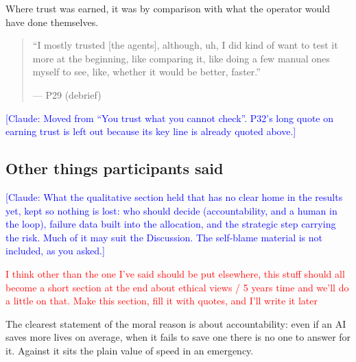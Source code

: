 \label{sec:qual:trust-unchecked:earned}
Where trust was earned, it was by comparison with what the operator would have done themselves.

\begin{quote}\small
``I mostly trusted [the agents], although, uh, I did kind of want to test it more at the beginning, like comparing it, like doing a few manual ones myself to see, like, whether it would be better, faster.''\par\hfill--- P29 (debrief)
\end{quote}
\textcolor{blue}{[Claude: Moved from ``You trust what you cannot check''. P32's long quote on earning trust is left out because its key line is already quoted above.]}

\clearpage

\subsection{Other things participants said}\label{sec:qual}\label{sec:qual:who-decides}\label{sec:qual:failure}
\textcolor{blue}{[Claude: What the qualitative section held that has no clear home in the results yet, kept so nothing is lost: who should decide (accountability, and a human in the loop), failure data built into the allocation, and the strategic step carrying the risk. Much of it may suit the Discussion. The self-blame material is not included, as you asked.]}

\textcolor{red}{I think other than the one I've said should be put elsewhere, this stuff should all become a short section at the end about ethical views / 5 years time and we'll do a little on that. Make this section, fill it with quotes, and I'll write it later}

\label{sec:qual:who-decides:accountability}
The clearest statement of the moral reason is about accountability: even if an AI saves more lives on average, when it fails to save one there is no one to answer for it. Against it sits the plain value of speed in an emergency.

